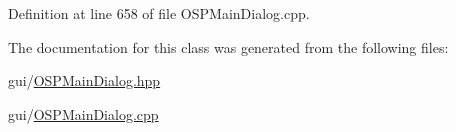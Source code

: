 Definition at line 658 of file O\-S\-P\-Main\-Dialog.\-cpp.



The documentation for this class was generated from the following files\-:\begin{DoxyCompactItemize}
\item 
gui/\hyperlink{_o_s_p_main_dialog_8hpp}{O\-S\-P\-Main\-Dialog.\-hpp}\item 
gui/\hyperlink{_o_s_p_main_dialog_8cpp}{O\-S\-P\-Main\-Dialog.\-cpp}\end{DoxyCompactItemize}
